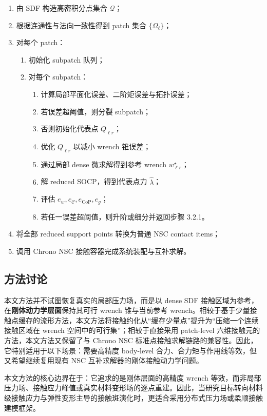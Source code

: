 \begin{enumerate}[label=\arabic*.]
    \item 由 SDF 构造高密积分点集合 $\mathcal{Q}$；
    \item 根据连通性与法向一致性得到 patch 集合 $\{\Omega_\ell\}$；
    \item 对每个 patch：
    \begin{enumerate}[label*=\arabic*.]
        \item 初始化 subpatch 队列；
        \item 对每个 subpatch：
        \begin{enumerate}[label*=\arabic*.]
            \item 计算局部平面化误差、二阶矩误差与拓扑误差；
            \item 若误差超阈值，则分裂 subpatch；
            \item 否则初始化代表点 $Q_{\ell r}$；
            \item 优化 $Q_{\ell r}$ 以减小 wrench 锥误差；
            \item 通过局部 dense 微求解得到参考 wrench $w_{\ell r}^\star$；
            \item 解 reduced SOCP，得到代表点力 $\hat{\lambda}$；
            \item 评估 $e_w,e_{\mathcal{C}},e_{\mathrm{CoP}},e_g$；
            \item 若任一误差超阈值，则升阶或细分并返回步骤 3.2.1。
        \end{enumerate}
    \end{enumerate}
    \item 将全部 reduced support points 转换为普通 NSC contact items；
    \item 调用 Chrono NSC 接触容器完成系统装配与互补求解。
\end{enumerate}

\subsection{方法讨论}

本文方法并不试图恢复真实的局部压力场，而是以 dense SDF 接触区域为参考，在\textbf{刚体动力学层面}保持其可行 wrench 锥与当前参考 wrench。相较于基于少量接触点缓存的流形方法，本文方法将接触约化从“缓存少量点”提升为“压缩一个连续接触区域在 wrench 空间中的可行集”；相较于直接采用 patch-level 六维接触元的方法，本文方法又保留了与 Chrono NSC 标准点接触求解链路的兼容性。因此，它特别适用于以下场景：需要高精度 body-level 合力、合力矩与作用线等效，但又希望继续复用现有 NSC 互补求解器的刚体接触动力学问题。

\begin{remark}
本文方法的核心边界在于：它追求的是刚体层面的高精度 wrench 等效，而非局部压力场、接触应力峰值或真实材料变形场的逐点重建。因此，当研究目标转向材料级接触应力与弹性变形主导的接触斑演化时，更适合采用分布式压力场或柔顺接触建模框架。
\end{remark}
